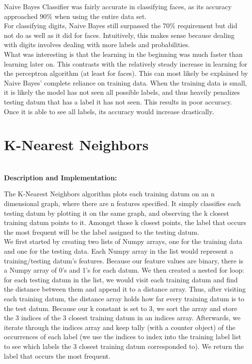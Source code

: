 \documentclass{article}
\begin{document}
Naive Bayes Classifier was fairly accurate in classifying faces, as its accuracy approached 90\% when using the entire data set.\\

For classifying digits, Naive Bayes still surpassed the 70\% requirement but did not do as well as it did for faces. Intuitively, this makes sense because dealing with digits involves dealing with more labels and probabilities.\\

What was interesting is that the learning in the beginning was much faster than learning later on. This contrasts with the relatively steady increase in learning for the perceptron algorithm (at least for faces). This can most likely be explained by Naive Bayes' complete reliance on training data. When the training data is small, it is likely the model has not seen all possible labels, and thus heavily penalizes testing datum that has a label it has not seen. This results in poor accuracy. Once it is able to see all labels, its accuracy would increase drastically. 


\section{K-Nearest Neighbors}\\

\textbf{Description and Implementation:}

The K-Nearest Neighbors algorithm plots each training datum on an n dimensional graph, where there are n features specified. It simply classifies each testing datum by plotting it on the same graph, and observing the k closest training datum points to it. Amongst those k closest points, the label that occurs the most frequent will be the label assigned to the testing datum.\\

We first started by creating two lists of Numpy arrays, one for the training data and one for the testing data. Each Numpy array in the list would represent a training/testing datum's features. Because our feature values are binary, there is a Numpy array of 0's and 1's for each datum. We then created a nested for loop: for each testing datum in the list, we would visit each training datum and find the distance between them and append it to a distance array. Thus, after visiting each training datum, the distance array holds how far every training datum is to the test datum. Because our k constant is set to 3, we sort the array and store the 3 indices of the 3 closest training datum in an indices array. Afterwards, we iterate through the indices array and keep tally (with a counter object) of the occurrences of each label (we use the indices to index into the training label list to see which labels the 3 closest training datum corresponded to). We return the label that occurs the most frequent.\\
\end{document}
